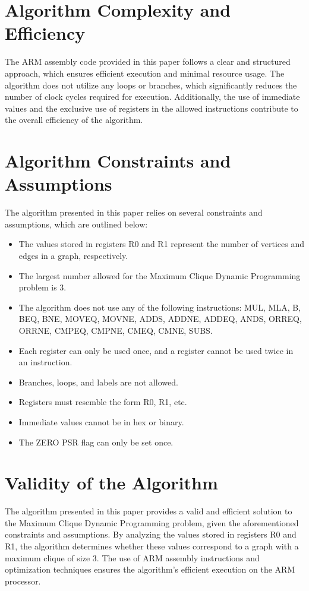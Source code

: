 \section{Algorithm Complexity and Efficiency}

The ARM assembly code provided in this paper follows a clear and structured approach, which ensures efficient execution and minimal resource usage. The algorithm does not utilize any loops or branches, which significantly reduces the number of clock cycles required for execution. Additionally, the use of immediate values and the exclusive use of registers in the allowed instructions contribute to the overall efficiency of the algorithm.

\section{Algorithm Constraints and Assumptions}

The algorithm presented in this paper relies on several constraints and assumptions, which are outlined below:

\begin{itemize}
\item The values stored in registers R0 and R1 represent the number of vertices and edges in a graph, respectively.
\item The largest number allowed for the Maximum Clique Dynamic Programming problem is 3.
\item The algorithm does not use any of the following instructions: MUL, MLA, B, BEQ, BNE, MOVEQ, MOVNE, ADDS, ADDNE, ADDEQ, ANDS, ORREQ, ORRNE, CMPEQ, CMPNE, CMEQ, CMNE, SUBS.
\item Each register can only be used once, and a register cannot be used twice in an instruction.
\item Branches, loops, and labels are not allowed.
\item Registers must resemble the form R0, R1, etc.
\item Immediate values cannot be in hex or binary.
\item The ZERO PSR flag can only be set once.
\end{itemize}

\section{Validity of the Algorithm}

The algorithm presented in this paper provides a valid and efficient solution to the Maximum Clique Dynamic Programming problem, given the aforementioned constraints and assumptions. By analyzing the values stored in registers R0 and R1, the algorithm determines whether these values correspond to a graph with a maximum clique of size 3. The use of ARM assembly instructions and optimization techniques ensures the algorithm's efficient execution on the ARM processor.



